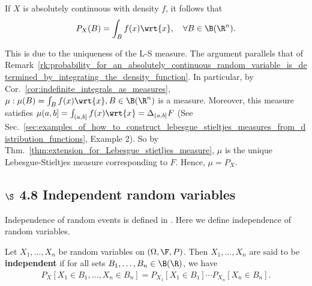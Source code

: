 \documentclass{article} %
\begin{document}
\begin{remark}
If $X$ is absolutely continuous with density $f$, it follows that
\begin{align}
P_X(B) = \int_B f(x) \wrt{x}, \quad \forall B \in \B(\R^n).
\label{eqn:probability_for_an_absolutely_continuous_random_vector_is_determined_by_integrating_the_density_function}	
\end{align}

This is due to the uniqueness of the L-S measure. The argument parallels that of Remark~\ref{rk:probability_for_an_absolutely_continuous_random_variable_is_determined_by_integrating_the_density_function}.	 In particular, by Cor.~\ref{cor:indefinite_integrals_as_measures}, $\mu : \mu(B) = \int_B f(x) \wrt{x}, B \in \B(\R^n)$ is a measure.  Moreover, this measure satisfies $\mu(a,b] = \int_{(a,b]} f(x) \wrt{x} = \Delta_{(a,b]} F$ (See Sec.~\ref{sec:examples_of_how_to_construct_lebesgue_stieltjes_measures_from_distribution_functions}, Example 2).  So by Thm.~\ref{thm:extension_for_Lebesgue_stietljes_measure},  $\mu$ is the unique Lebesgue-Stieltjes measure corresponding to $F$. Hence, $\mu=P_X$.
\label{rk:probability_for_an_absolutely_continuous_random_vector_is_determined_by_integrating_the_density_function}	
\end{remark}





\subsection{$\S$ 4.8 Independent random variables}

Independence of random events is defined in \cite[Sec.~4.3]{ash2000probability}.   Here we define independence of random variables.

\begin{definition}
Let $X_1,\hdots, X_n$ be random variables on $(\Omega, \F, P)$.  Then $X_1,\hdots, X_n$ are said to be \textbf{independent} if for all sets $B_1, \hdots, B_n \in \B(\R)$, we have 
\begin{align}
P_X[X_1 \in B_1, \hdots, X_n \in B_n] = P_{X_1}[X_1 \in B_1] \cdots P_{X_n}[X_n \in B_n].	
\label{eqn:independence_of_random_variables}	
\end{align}

\label{def:independence_of_random_variables}
\end{definition}
\end{document}
